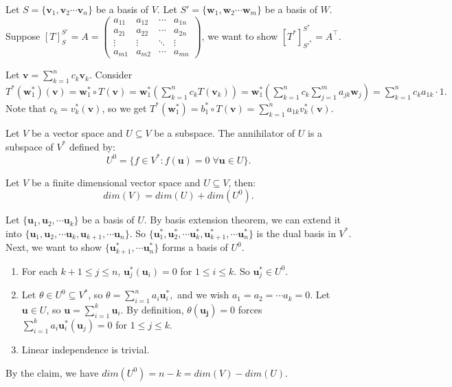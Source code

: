 \begin{pfbox}
Let $S=\{\mathbf{v}_1,\mathbf{v}_2\cdots\mathbf{v}_n\}$ be a basis of $V$.
Let $S'=\{\mathbf{w}_1,\mathbf{w}_2\cdots\mathbf{w}_m\}$ be a basis of $W$.
Suppose $[T]^{S'}_{S}=A=\begin{pmatrix}
    a_{11}&a_{12} &\cdots & a_{1n}\\
    a_{21}&a_{22} &\cdots & a_{2n}\\
    \vdots & \vdots & \ddots & \vdots\\
    a_{m1} & a_{m2} & \cdots &a_{mn} 
\end{pmatrix}$, we want to show $[T^*]^{S^*}_{S'^*}=A^\top$.

Let $\mathbf{v} = \sum_{k=1}^{n}c_k\mathbf{v}_k$. Consider $T^*(\mathbf{w}^*_1)(\mathbf{v})=\mathbf{w}^*_1\circ T(\mathbf{v}) = \mathbf{w}^*_1 (\sum_{k=1}^{n}c_k T(\mathbf{v}_k))=
\mathbf{w}^*_1 (\sum_{k=1}^{n}c_k \sum_{j=1}^{m}a_{jk}\mathbf{w}_j)=\sum_{k=1}^{n}c_k a_{1k}\cdot 1.$
Note that $c_k = v^*_k(\mathbf{v})$, so we get $T^*(\mathbf{w}^*_1)=b^*_1\circ T(\mathbf{v})=\sum_{k=1}^{n}a_{1k}v^*_k(\mathbf{v}).$
\label{thm6.3}
\end{pfbox}


\begin{definition}[Annihilator]
    Let $V$ be a vector space and $U\subseteq V$ be a subspace. The annihilator of $U$ is a subspace of $V^*$ defined by:
    \[U^0=\{f\in V^*:f(\mathbf{u})=0\;\forall\mathbf{u}\in U\}.\]
\end{definition}

\begin{theorem}
    Let $V$ be a finite dimensional vector space and $U\subseteq V$, then:
    \[dim(V)=dim(U)+dim(U^0).\]
    \label{ld1}
\end{theorem}

\begin{pfbox}
    Let $\{\mathbf{u}_1,\mathbf{u}_2,\cdots \mathbf{u}_k\}$ be a basis of $U$.
    By basis extension theorem, we can extend it into $\{\mathbf{u}_1,\mathbf{u}_2,\cdots \mathbf{u}_k,\mathbf{u}_{k+1},\cdots\mathbf{u}_n\}$.
    So $\{\mathbf{u}^*_1,\mathbf{u}^*_2,\cdots \mathbf{u}^*_k,\mathbf{u}^*_{k+1},\cdots\mathbf{u}^*_n\}$ is the dual basis in $V^*$.
    Next, we want to show $\{\mathbf{u}^*_{k+1},\cdots\mathbf{u}^*_n\}$ forms a basis of $U^0.$
    \begin{enumerate}
        \item For each $k+1\le j\le n$, $\mathbf{u}^*_j(\mathbf{u}_i)=0$ for $1\le i\le k.$ So $\mathbf{u}^*_j\in U^0.$
        \item Let $\theta\in U^0\subseteq V^*$, so $\theta=\sum_{i=1}^{n}a_i\mathbf{u}^*_i,$ and we wish $a_1=a_2=\cdots a_k = 0$.
        Let $\mathbf{u}\in U$, so $\mathbf{u}=\sum_{i=1}^{k}\mathbf{u}_i$. By definition, $\theta(\mathbf{u_j})=0$ forces $\sum_{i=1}^{k}a_i\mathbf{u}^*_i(\mathbf{u}_j)=0$ for $1\le j\le k$.
        \item Linear independence is trivial.
    \end{enumerate}
    By the claim, we have $dim(U^0)=n-k=dim(V)-dim(U).$
\end{pfbox}



